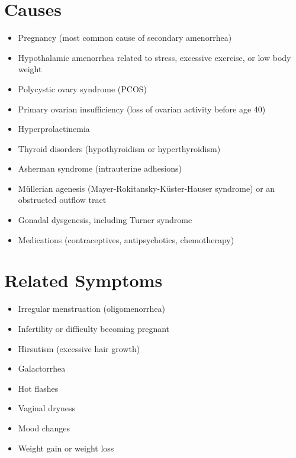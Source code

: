 \section*{Causes}
\begin{itemize}
\item Pregnancy (most common cause of secondary amenorrhea)
\item Hypothalamic amenorrhea related to stress, excessive exercise, or low body weight
\item Polycystic ovary syndrome (PCOS)
\item Primary ovarian insufficiency (loss of ovarian activity before age 40)
\item Hyperprolactinemia
\item Thyroid disorders (hypothyroidism or hyperthyroidism)
\item Asherman syndrome (intrauterine adhesions)
\item Müllerian agenesis (Mayer-Rokitansky-Küster-Hauser syndrome) or an obstructed outflow tract
\item Gonadal dysgenesis, including Turner syndrome
\item Medications (contraceptives, antipsychotics, chemotherapy)
\end{itemize}

\section*{Related Symptoms}
\begin{itemize}
\item Irregular menstruation (oligomenorrhea)
\item Infertility or difficulty becoming pregnant
\item Hirsutism (excessive hair growth)
\item Galactorrhea
\item Hot flashes
\item Vaginal dryness
\item Mood changes
\item Weight gain or weight loss
\end{itemize}

